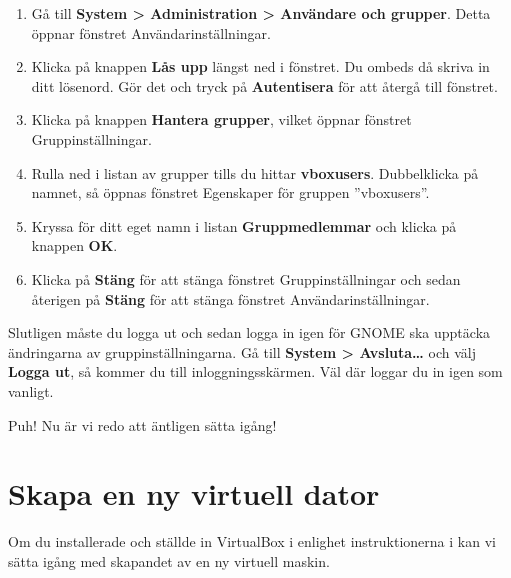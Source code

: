 \documentclass[a4paper,final]{memoir} %
\begin{document}
\begin{enumerate}

\item Gå till \textbf{System \textgreater{} Administration \textgreater{} Användare och grupper}. Detta öppnar fönstret Användarinställningar.

\item Klicka på knappen \textbf{Lås upp} längst ned i fönstret. Du ombeds då skriva in ditt lösenord. Gör det och tryck på \textbf{Autentisera} för att återgå till fönstret.

\item Klicka på knappen \textbf{Hantera grupper}, vilket öppnar fönstret Grupp\-inställningar.

\item Rulla ned i listan av grupper tills du hittar \textbf{vboxusers}. Dubbelklicka på namnet, så öppnas fönstret Egenskaper för gruppen ''vboxusers''.

\item Kryssa för ditt eget namn i listan \textbf{Gruppmedlemmar} och klicka på knappen \textbf{OK}.

\item Klicka på \textbf{Stäng} för att stänga fönstret Gruppinställningar och sedan återigen på \textbf{Stäng} för att stänga fönstret Användarinställningar.

\end{enumerate}

Slutligen måste du logga ut och sedan logga in igen för GNOME ska upptäcka ändringarna av gruppinställningarna. Gå till \textbf{System \textgreater{} Avsluta\ldots{}} och välj \textbf{Logga ut}, så kommer du till inloggningsskärmen. Väl där loggar du in igen som vanligt. 

Puh! Nu är vi redo att äntligen sätta igång!


\section{Skapa en ny virtuell dator}


Om du installerade och ställde in VirtualBox i enlighet instruktionerna i  kan vi sätta igång med skapandet av en ny virtuell maskin.
\end{document}
